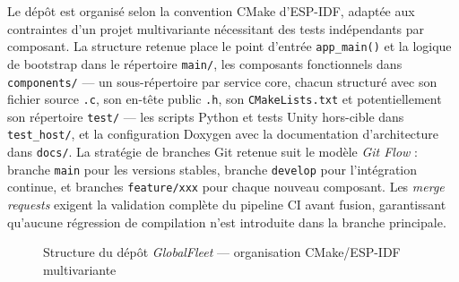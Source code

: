 Le dépôt est organisé selon la convention CMake d'ESP-IDF, adaptée
aux contraintes d'un projet multivariante nécessitant des tests
indépendants par composant. La structure retenue place le point
d'entrée \texttt{app\_main()} et la logique de bootstrap dans le
répertoire \texttt{main/}, les composants fonctionnels dans
\texttt{components/} --- un sous-répertoire par service core, chacun
structuré avec son fichier source \texttt{.c}, son en-tête public
\texttt{.h}, son \texttt{CMakeLists.txt} et potentiellement son
répertoire \texttt{test/} --- les scripts Python et tests Unity
hors-cible dans \texttt{test\_host/}, et la configuration Doxygen
avec la documentation d'architecture dans \texttt{docs/}. La stratégie
de branches Git retenue suit le modèle \textit{Git Flow} : branche
\texttt{main} pour les versions stables, branche \texttt{develop}
pour l'intégration continue, et branches \texttt{feature/xxx} pour
chaque nouveau composant. Les \textit{merge requests} exigent la
validation complète du pipeline CI avant fusion, garantissant qu'aucune
régression de compilation n'est introduite dans la branche principale.

\begin{figure}[H]
\centering
{}
\caption{Structure du dépôt \textit{GlobalFleet} --- organisation CMake/ESP-IDF multivariante}
\label{fig:repo_structure}
\end{figure}
\newpage
